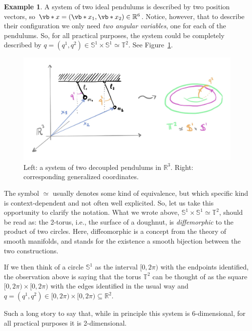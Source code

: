 \documentclass[english,fontsize=11pt,paper=b5]{scrbook}
\numberwithin{equation}{chapter}
\theoremstyle{definition}
\newtheorem{example}{Example}[chapter]
\newcommand{\emphidx}[1]{\index{#1}\emph{#1}}
\begin{document}
  \begin{example}\label{example:gcoords}
    A system of two ideal pendulums is described by two position vectors, so $\vb*{x} = (\vb*{x}_1, \vb*{x}_2)\in\mathbb{R}^{6}$.
    Notice, however, that to describe their configuration we only need \emph{two angular variables}, one for each of the pendulums.
    So, for all practical purposes, the system could be completely described by $q = (q^1, q^2) \in \mathbb{S}^1\times\mathbb{S}^1 \simeq \mathbb{T}^2$. See Figure~\ref{fig:twopend}.

    \begin{figure}[ht!]
      \centering
      \includegraphics[width=0.9\linewidth,trim={0 1cm 0 1cm}, clip]{images/HM-1-1.pdf}
      \caption{Left: a system of two decoupled pendulums in $\mathbb{R}^3$. Right: corresponding generalized coordinates.}%
      \label{fig:twopend}
    \end{figure}

    The symbol $\simeq$ usually denotes some kind of equivalence, but which specific kind is context-dependent and not often well explicited.
    So, let us take this opportunity to clarify the notation.
    What we wrote above, $\mathbb{S}^1\times\mathbb{S}^1 \simeq \mathbb{T}^2$, should be read as: the 2-torus, i.e., the surface of a doughnut, is \emphidx{diffemorphic} to the product of two circles. Here, diffeomorphic is a concept from the theory of smooth manifolds, and stands for the existence a smooth bijection between the two constructions.

    If we then think of a circle $\mathbb{S}^1$ as the interval $[0, 2\pi)$ with the endpoints identified, the observation above is saying that the torus $\mathbb{T}^2$ can be thought of as the square $[0, 2\pi)\times[0, 2\pi)$ with the edges identified in the usual way and $q = (q^1, q^2) \in [0, 2\pi)\times[0, 2\pi) \subseteq \mathbb{R}^2$.

    Such a long story to say that, while in principle this system is 6-dimensional, for all practical purposes it is 2-dimensional.
  \end{example}
\end{document}

